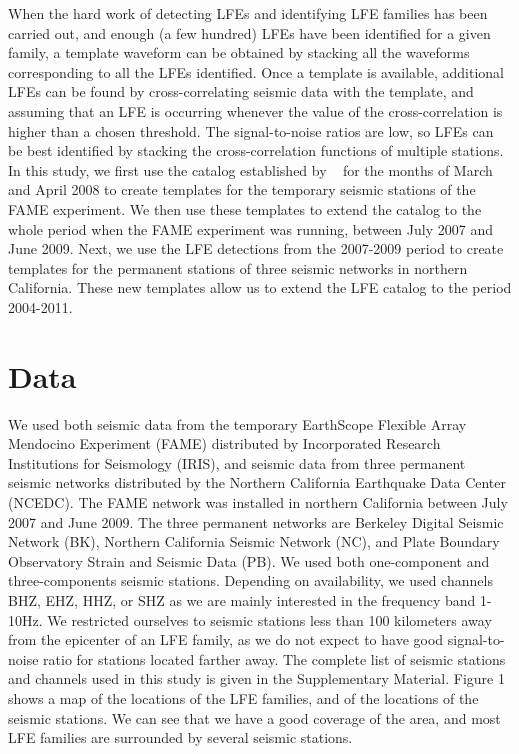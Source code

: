 \documentclass[draft]{agujournal2019}
\begin{document}
When the hard work of detecting LFEs and identifying LFE families has been carried out, and enough (a few hundred) LFEs have been identified for a given family, a template waveform can be obtained by stacking all the waveforms corresponding to all the LFEs identified. Once a template is available, additional LFEs can be found by cross-correlating seismic data with the template, and assuming that an LFE is occurring whenever the value of the cross-correlation is higher than a chosen threshold.  The signal-to-noise ratios are low, so LFEs can be best identified by stacking the cross-correlation functions of multiple stations. In this study, we first use the catalog established by ~ for the months of March and April 2008 to create templates for the temporary seismic stations of the FAME experiment. We then use these templates to extend the catalog to the whole period when the FAME experiment was running, between July 2007 and June 2009. Next, we use the LFE detections from the 2007-2009 period to create templates for the permanent stations of three seismic networks in northern California. These new templates allow us to extend the LFE catalog to the period 2004-2011.

\section{Data}

We used both seismic data from the temporary EarthScope Flexible Array Mendocino Experiment (FAME) distributed by Incorporated Research Institutions for Seismology (IRIS), and seismic data from three permanent seismic networks distributed by the Northern California Earthquake Data Center (NCEDC). The FAME network was installed in northern California between July 2007 and June 2009. The three permanent networks are Berkeley Digital Seismic Network (BK), Northern California Seismic Network (NC), and Plate Boundary Observatory Strain and Seismic Data (PB). We used both one-component and three-components seismic stations. Depending on availability, we used channels BHZ, EHZ, HHZ, or SHZ as we are mainly interested in the frequency band 1-10Hz. We restricted ourselves to seismic stations less than 100 kilometers away from the epicenter of an LFE family, as we do not expect to have good signal-to-noise ratio for stations located farther away. The complete list of seismic stations and channels used in this study is given in the Supplementary Material. Figure 1 shows a map of the locations of the LFE families, and of the locations of the seismic stations. We can see that we have a good coverage of the area, and most LFE families are surrounded by several seismic stations. \\
\end{document}
